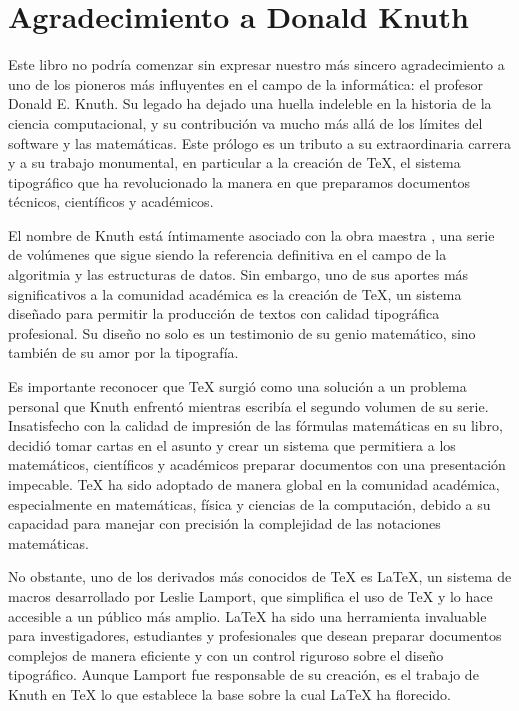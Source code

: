 \chapter[\hspace{2pc}Agradecimiento a Donald Knuth]{Agradecimiento a Donald Knuth}

Este libro no podría comenzar sin expresar nuestro más sincero agradecimiento a uno de los pioneros más influyentes en el campo de la informática: el profesor Donald E. Knuth. Su legado ha dejado una huella indeleble en la historia de la ciencia computacional, y su contribución va mucho más allá de los límites del software y las matemáticas. Este prólogo es un tributo a su extraordinaria carrera y a su trabajo monumental, en particular a la creación de \TeX{}, el sistema tipográfico que ha revolucionado la manera en que preparamos documentos técnicos, científicos y académicos.

El nombre de Knuth está íntimamente asociado con la obra maestra , una serie de volúmenes que sigue siendo la referencia definitiva en el campo de la algoritmia y las estructuras de datos. Sin embargo, uno de sus aportes más significativos a la comunidad académica es la creación de \TeX{}, un sistema diseñado para permitir la producción de textos con calidad tipográfica profesional. Su diseño no solo es un testimonio de su genio matemático, sino también de su amor por la tipografía.

Es importante reconocer que \TeX{} surgió como una solución a un problema personal que Knuth enfrentó mientras escribía el segundo volumen de su serie. Insatisfecho con la calidad de impresión de las fórmulas matemáticas en su libro, decidió tomar cartas en el asunto y crear un sistema que permitiera a los matemáticos, científicos y académicos preparar documentos con una presentación impecable. \TeX{} ha sido adoptado de manera global en la comunidad académica, especialmente en matemáticas, física y ciencias de la computación, debido a su capacidad para manejar con precisión la complejidad de las notaciones matemáticas.

No obstante, uno de los derivados más conocidos de \TeX{} es \LaTeX{}, un sistema de macros desarrollado por Leslie Lamport, que simplifica el uso de \TeX{} y lo hace accesible a un público más amplio. \LaTeX{} ha sido una herramienta invaluable para investigadores, estudiantes y profesionales que desean preparar documentos complejos de manera eficiente y con un control riguroso sobre el diseño tipográfico. Aunque Lamport fue responsable de su creación, es el trabajo de Knuth en \TeX{} lo que establece la base sobre la cual \LaTeX{} ha florecido.

